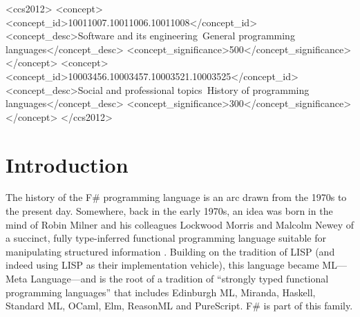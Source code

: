 \documentclass[acmsmall]{acmart}\settopmatter{}
\begin{document}
\begin{CCSXML}
<ccs2012>
<concept>
<concept_id>10011007.10011006.10011008</concept_id>
<concept_desc>Software and its engineering~General programming languages</concept_desc>
<concept_significance>500</concept_significance>
</concept>
<concept>
<concept_id>10003456.10003457.10003521.10003525</concept_id>
<concept_desc>Social and professional topics~History of programming languages</concept_desc>
<concept_significance>300</concept_significance>
</concept>
</ccs2012>
\end{CCSXML}





\maketitle


\section*{Introduction}

The history of the F\# programming language is an arc drawn from the 1970s to the present day.  Somewhere, back in
the early 1970s, an idea was born in the mind of Robin Milner and his colleagues Lockwood Morris and Malcolm Newey of a
succinct, fully type-inferred functional programming language suitable for manipulating structured information \citep{Gordon2000}.  Building
on the tradition of LISP (and indeed using LISP as their implementation vehicle), this language became ML---Meta Language---and
is the root of a tradition of ``strongly typed functional programming languages'' that includes Edinburgh ML, Miranda, Haskell,
Standard ML, OCaml, Elm, ReasonML and PureScript. F\# is part of this family.
\end{document}
